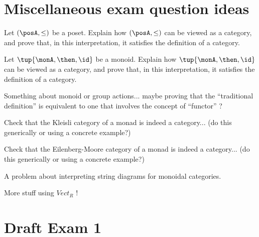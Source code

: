 \documentclass[paper=8.125in:10.250in,pagesize=pdftex,
    headinclude=false,footinclude=false,oneside,egregdoesnotlikesansseriftitles]{kaobook}
\begin{document}
\newpage

\section*{Miscellaneous exam question ideas}

\begin{gradedexercise}
Let $(\posA, \leq)$ be a poset. Explain how $(\posA, \leq)$ can be viewed as a category, and prove that, in this interpretation, it satisfies the definition of a category. 
\end{gradedexercise}


\begin{gradedexercise}
Let $\tup{\monA, \then, \id}$ be a monoid. Explain how $\tup{\monA, \then, \id}$ can be viewed as a category, and prove that, in this interpretation, it satisfies the definition of a category. 
\end{gradedexercise}


\begin{gradedexercise}
Something about monoid or group actions... maybe proving that the ``traditional definition'' is equivalent to one that involves the concept of ``functor'' ?
\end{gradedexercise}


\begin{gradedexercise}
Check that the Kleisli category of a monad is indeed a category... (do this generically or using a concrete example?)
\end{gradedexercise}

\begin{gradedexercise}
Check that the Eilenberg-Moore category of a monad is indeed a category...  (do this generically or using a concrete example?)
\end{gradedexercise}


\begin{gradedexercise}
A problem about interpreting string diagrams for monoidal categories. 
\end{gradedexercise}


\begin{gradedexercise}
More stuff using $Vect_R$ !
\end{gradedexercise}

\newpage

\section*{Draft Exam 1}
\end{document}
